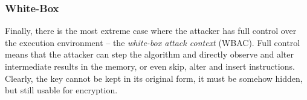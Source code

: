 \subsubsection{White-Box}

Finally, there is the most extreme case where the attacker has full control over the execution environment -- the {\em white-box attack context} (WBAC). Full control means that the attacker can step the algorithm and directly observe and alter intermediate results in the memory, or even skip, alter and insert instructions. Clearly, the key cannot be kept in its original form, it must be somehow hidden, but still usable for encryption.
